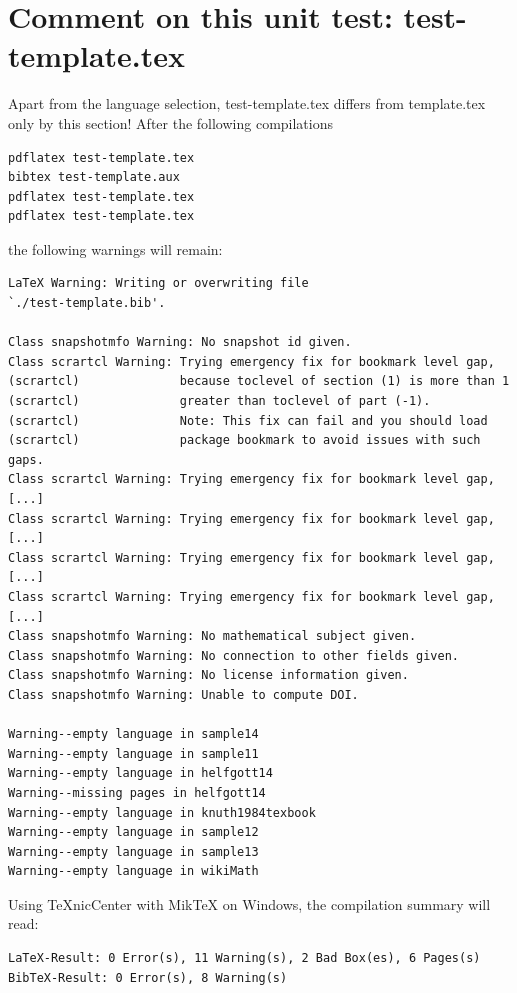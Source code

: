 \documentclass{snapshotmfo}
\begin{document}
\section{Comment on this unit test: test-template.tex}
Apart from the language selection, test-template.tex differs from template.tex only by this section!
After the following compilations
\begin{small}
\begin{verbatim}
pdflatex test-template.tex
bibtex test-template.aux
pdflatex test-template.tex
pdflatex test-template.tex
\end{verbatim}
\end{small}
the following warnings will remain:
\begin{small}
\begin{verbatim}
LaTeX Warning: Writing or overwriting file
`./test-template.bib'.

Class snapshotmfo Warning: No snapshot id given.
Class scrartcl Warning: Trying emergency fix for bookmark level gap,
(scrartcl)              because toclevel of section (1) is more than 1
(scrartcl)              greater than toclevel of part (-1).
(scrartcl)              Note: This fix can fail and you should load
(scrartcl)              package bookmark to avoid issues with such gaps.
Class scrartcl Warning: Trying emergency fix for bookmark level gap,
[...]
Class scrartcl Warning: Trying emergency fix for bookmark level gap,
[...]
Class scrartcl Warning: Trying emergency fix for bookmark level gap,
[...]
Class scrartcl Warning: Trying emergency fix for bookmark level gap,
[...]
Class snapshotmfo Warning: No mathematical subject given.
Class snapshotmfo Warning: No connection to other fields given.
Class snapshotmfo Warning: No license information given.
Class snapshotmfo Warning: Unable to compute DOI.

Warning--empty language in sample14
Warning--empty language in sample11
Warning--empty language in helfgott14
Warning--missing pages in helfgott14
Warning--empty language in knuth1984texbook
Warning--empty language in sample12
Warning--empty language in sample13
Warning--empty language in wikiMath
\end{verbatim}
\end{small}

Using TeXnicCenter with MikTeX on Windows, the compilation summary will read:
\begin{small}
\begin{verbatim}
LaTeX-Result: 0 Error(s), 11 Warning(s), 2 Bad Box(es), 6 Pages(s)
BibTeX-Result: 0 Error(s), 8 Warning(s)
\end{verbatim}
\end{small}
\end{document}
